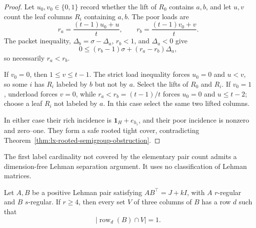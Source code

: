 \begin{proof}
Let $u_0,v_0\in\{0,1\}$ record whether the lift of $R_0$ contains $a,b$,
and let $u,v$ count the leaf columns $R_i$ containing $a,b$.  The poor loads
are
\[
 r_a=\frac{(t-1)u_0+u}{t},
 \qquad
 r_b=\frac{(t-1)v_0+v}{t}.
\]
The packet inequality, $\Delta_b=\sigma-\Delta_a$, $r_b<1$, and
$\Delta_a<0$ give
\[
 0\leq(r_b-1)\sigma+(r_a-r_b)\Delta_a,
\]
so necessarily $r_a<r_b$.

If $v_0=0$, then $1\leq v\leq t-1$.  The strict load inequality forces
$u_0=0$ and $u<v$, so some $i$ has $R_i$ labeled by $b$ but not by $a$.
Select the lifts of $R_0$ and $R_i$.  If $v_0=1$, underload forces $v=0$,
while $r_a<r_b=(t-1)/t$ forces $u_0=0$ and $u\leq t-2$; choose a leaf
$R_i$ not labeled by $a$.  In this case select the same two lifted columns.

In either case their rich incidence is
$\mathbf1_H+e_{h_i}$, and their poor incidence is nonzero and zero--one.
They form a safe rooted tight cover, contradicting
Theorem~\ref{thm:lx-rooted-semigroup-obstruction}.
\end{proof}

The first label cardinality not covered by the elementary pair count admits a
dimension-free Lehman separation argument.  It uses no classification of
Lehman matrices.

\begin{lemma}
\label{lem:lx-three-column-lehman-separation}
Let $A,B$ be a positive Lehman pair satisfying
$AB^\top=J+kI$, with $A$ $r$-regular and $B$ $s$-regular.  If $r\geq4$,
then every set $V$ of three columns of $B$ has a row $d$ such that
\[
 |\operatorname{row}_d(B)\cap V|=1.                \tag{LH-3}
 \label{eq:lx-three-column-lehman-separation}
\]
\end{lemma}


